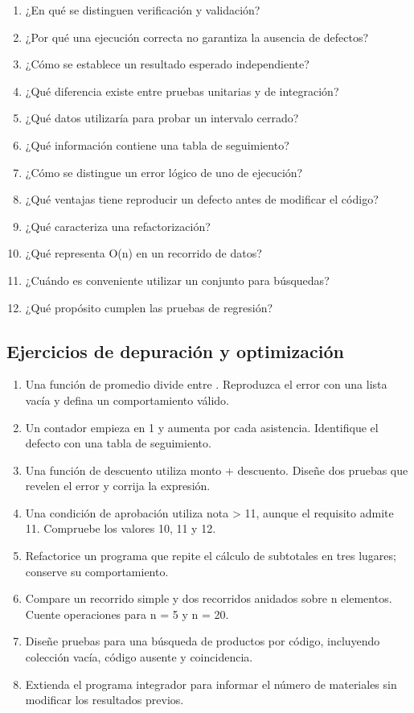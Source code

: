\begin{enumerate}
\item ¿En qué se distinguen verificación y validación?
\item ¿Por qué una ejecución correcta no garantiza la ausencia de defectos?
\item ¿Cómo se establece un resultado esperado independiente?
\item ¿Qué diferencia existe entre pruebas unitarias y de integración?
\item ¿Qué datos utilizaría para probar un intervalo cerrado?
\item ¿Qué información contiene una tabla de seguimiento?
\item ¿Cómo se distingue un error lógico de uno de ejecución?
\item ¿Qué ventajas tiene reproducir un defecto antes de modificar el código?
\item ¿Qué caracteriza una refactorización?
\item ¿Qué representa O(n) en un recorrido de datos?
\item ¿Cuándo es conveniente utilizar un conjunto para búsquedas?
\item ¿Qué propósito cumplen las pruebas de regresión?
\end{enumerate}

\subsection{Ejercicios de depuración y optimización}

\begin{enumerate}
\item Una función de promedio divide entre . Reproduzca el error con una lista vacía y defina un comportamiento válido.
\item Un contador empieza en 1 y aumenta por cada asistencia. Identifique el defecto con una tabla de seguimiento.
\item Una función de descuento utiliza monto + descuento. Diseñe dos pruebas que revelen el error y corrija la expresión.
\item Una condición de aprobación utiliza nota > 11, aunque el requisito admite 11. Compruebe los valores 10, 11 y 12.
\item Refactorice un programa que repite el cálculo de subtotales en tres lugares; conserve su comportamiento.
\item Compare un recorrido simple y dos recorridos anidados sobre n elementos. Cuente operaciones para n = 5 y n = 20.
\item Diseñe pruebas para una búsqueda de productos por código, incluyendo colección vacía, código ausente y coincidencia.
\item Extienda el programa integrador para informar el número de materiales sin modificar los resultados previos.
\end{enumerate}

